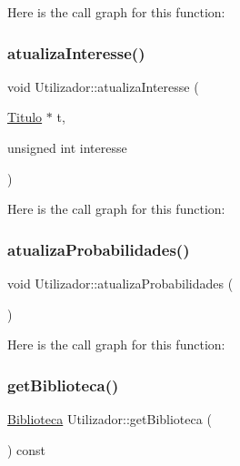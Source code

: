 Here is the call graph for this function\+:
\mbox{\label{class_utilizador_a4617169b0764e48f8b95d4d8aa12bf19}} 
\subsubsection{\texorpdfstring{atualiza\+Interesse()}{atualizaInteresse()}}
{\footnotesize\ttfamily void Utilizador\+::atualiza\+Interesse (\begin{DoxyParamCaption}\item[{\mbox{\hyperlink{class_titulo}{Titulo}} $\ast$}]{t,  }\item[{unsigned int}]{interesse }\end{DoxyParamCaption})}

Here is the call graph for this function\+:
\mbox{\label{class_utilizador_a82b216e27c9716cce49a7b98d59445cb}} 
\subsubsection{\texorpdfstring{atualiza\+Probabilidades()}{atualizaProbabilidades()}}
{\footnotesize\ttfamily void Utilizador\+::atualiza\+Probabilidades (\begin{DoxyParamCaption}{ }\end{DoxyParamCaption})}

Here is the call graph for this function\+:
\mbox{\label{class_utilizador_a6a128859b776bf019b5652ce61f62280}} 
\subsubsection{\texorpdfstring{get\+Biblioteca()}{getBiblioteca()}}
{\footnotesize\ttfamily \mbox{\hyperlink{class_biblioteca}{Biblioteca}} Utilizador\+::get\+Biblioteca (\begin{DoxyParamCaption}{ }\end{DoxyParamCaption}) const}



